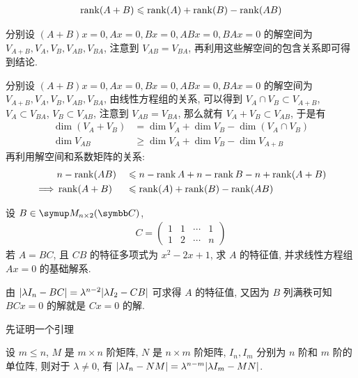 \begin{exercise}[series=exer]
  \begin{align*}
      \rank(A + B) \leqslant \rank(A) + \rank(B) - \rank(AB)
  \end{align*}
  \begin{hint}
      分别设 $ (A + B)x = 0, Ax = 0, Bx = 0, ABx = 0, BAx = 0 $ 的解空间为 $ V_{A+B}, V_{A}, V_{B}, V_{AB}, V_{BA} $, 注意到 $ V_{AB} = V_{BA} $, 再利用这些解空间的包含关系即可得到结论.
  \end{hint}
  \begin{answer}
      分别设 $ (A + B)x = 0, Ax = 0, Bx = 0, ABx = 0, BAx = 0 $ 的解空间为 $ V_{A+B}, V_{A}, V_{B}, V_{AB}, V_{BA} $, 由线性方程组的关系, 可以得到 $ V_{A} \cap V_{B} \subset V_{A + B} $, $ V_{A} \subset V_{BA}  $, $ V_{B} \subset V_{AB} $, 注意到 $ V_{AB} = V_{BA} $, 那么就有 $ V_{A} + V_{B} \subset V_{AB} $, 于是有
      \begin{align*}
          \dim(V_{A} + V_{B}) & = \dim V_{A} + \dim V_{B} - \dim(V_{A} \cap V_{B})\\
          \dim V_{AB} & \ge  \dim V_{A} + \dim V_{B} - \dim V_{A + B}
      \end{align*}
      再利用解空间和系数矩阵的关系:
      \begin{alignat*}{2}
          & n - \rank (AB) && \leqslant  n - \rank A + n - \rank B - n + \rank (A + B) \\
          \implies & \rank(A + B) && \leqslant \rank(A) + \rank(B) - \rank(AB)
      \end{alignat*}
  \end{answer}
  \item 设 $ B \in \MM[\C][n \times 2] $,
  \begin{align*}
      C = \begin{pmatrix}
          1 & 1 & \cdots & 1\\
          1 & 2 & \cdots & n
      \end{pmatrix}
  \end{align*}
  若 $ A = BC $, 且 $ CB $ 的特征多项式为 $ x^{2} - 2x + 1 $, 求 $ A $ 的特征值, 并求线性方程组 $ Ax = 0 $ 的基础解系.
  \begin{hint}
      由 $ \abs{\lambda I_{n} - BC} = \lambda^{n - 2}\abs{\lambda I_{2} - CB} $ 可求得 $ A $ 的特征值, 又因为 $ B $ 列满秩可知 $ BCx=0 $ 的解就是 $ Cx = 0 $ 的解.
  \end{hint}
  \begin{answer}
      先证明一个引理
      \begin{lemma}
          设 $ m \le n $, $ M $ 是 $ m \times n $ 阶矩阵, $ N $ 是 $ n \times m $ 阶矩阵, $ I_{n}, I_{m} $ 分别为 $ n $ 阶和 $ m $ 阶的单位阵, 则对于 $ \lambda \ne 0 $, 有 $ \abs{\lambda I_{n} - NM} = \lambda^{n - m}\abs{\lambda I_{m} - MN} $.

\end{lemma}
\end{answer}
\end{exercise}
